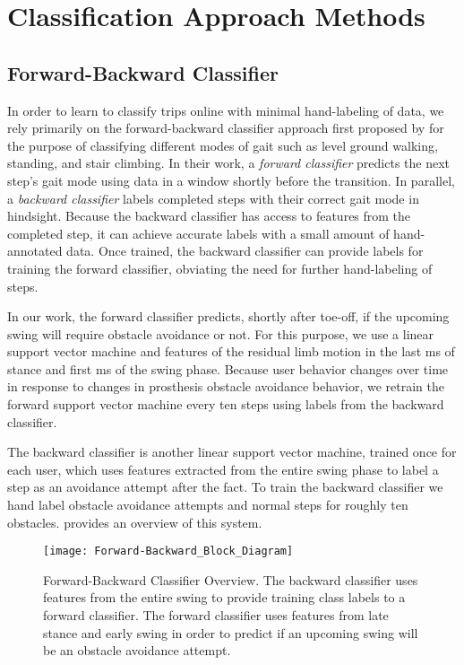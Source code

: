 \section{Classification Approach Methods}
\subsection{Forward-Backward Classifier}
In order to learn to classify trips online with minimal hand-labeling of data,
we rely primarily on the forward-backward classifier approach first proposed by
\citet{spanias2018online} for the purpose of classifying different modes of gait
such as level ground walking, standing, and stair climbing. In their work, a
\emph{forward classifier} predicts the next step's gait mode using data in a
window shortly before the transition. In parallel, a \emph{backward classifier}
labels completed steps with their correct gait mode in hindsight. Because the
backward classifier has access to features from the completed step, it can
achieve accurate labels with a small amount of hand-annotated data. Once
trained, the backward classifier can provide labels for training the forward
classifier, obviating the need for further hand-labeling of steps. 

In our work, the forward classifier predicts, shortly after toe-off, if the
upcoming swing will require obstacle avoidance or not. For this purpose, we use
a linear support vector machine and features of the residual limb motion in the
last \unit[210]{ms} of stance and first \unit[90]{ms} of the swing phase.
Because user behavior changes over time in response to changes in prosthesis
obstacle avoidance behavior, we retrain the forward support vector machine every
ten steps using labels from the backward classifier. 

The backward classifier is another linear support vector machine, trained once
for each user, which uses features extracted from the entire swing phase to
label a step as an avoidance attempt after the fact. To train the backward
classifier we hand label obstacle avoidance attempts and normal steps for
roughly ten obstacles.  provides an overview of this system.

\begin{figure}[tb]
    \centerline{\texttt{[image: Forward-Backward\_Block\_Diagram]}}
    \caption[Forward-Backward Classifier Overview]{Forward-Backward Classifier
    Overview. The backward classifier uses features from the entire swing to
    provide training class labels to a forward classifier. The forward
    classifier uses features from late stance and early swing in order to
    predict if an upcoming swing will be an obstacle avoidance
    attempt.}\label{fig:fwd_back}
\end{figure}

